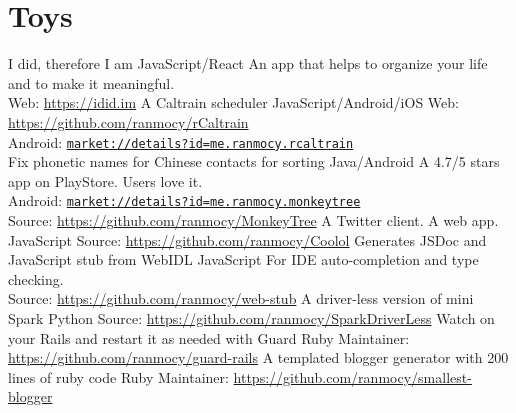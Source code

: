 \documentclass[]{friggeri-cv} %
\begin{document}

\section{Toys}

\begin{entrylist}
  {I did, therefore I am}
  {JavaScript/React}
  {
    An app that helps to organize your life and to make it meaningful.\\
    Web: \url{https://idid.im}
  }
  {A Caltrain scheduler}
  {JavaScript/Android/iOS}
  {
    Web: \url{https://github.com/ranmocy/rCaltrain}\\
    Android: \href{https://play.google.com/store/apps/details?id=me.ranmocy.rcaltrain}{\texttt{market://details?id=me.ranmocy.rcaltrain}}\\
  }
  {Fix phonetic names for Chinese contacts for sorting}
  {Java/Android}
  {
    A 4.7/5 stars app on PlayStore. Users love it.\\
    Android: \href{https://play.google.com/store/apps/details?id=me.ranmocy.monkeytree}{\texttt{market://details?id=me.ranmocy.monkeytree}}\\
    Source: \url{https://github.com/ranmocy/MonkeyTree}
  }
  {A Twitter client. A web app.}
  {JavaScript}
  {
    Source: \url{https://github.com/ranmocy/Coolol}
  }
  {Generates JSDoc and JavaScript stub from WebIDL}
  {JavaScript}
  {
    For IDE auto-completion and type checking.\\
    Source: \url{https://github.com/ranmocy/web-stub}
  }
  {A driver-less version of mini Spark}
  {Python}
  {
    Source: \url{https://github.com/ranmocy/SparkDriverLess}
  }
  {Watch on your Rails and restart it as needed with Guard}
  {Ruby}
  {
    Maintainer: \url{https://github.com/ranmocy/guard-rails}
  }
  {A templated blogger generator with 200 lines of ruby code}
  {Ruby}
  {
    Maintainer: \url{https://github.com/ranmocy/smallest-blogger}
  }
\end{entrylist}
\end{document}
